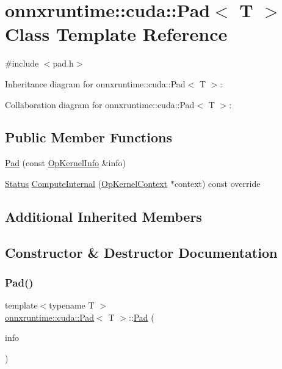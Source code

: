 \hypertarget{classonnxruntime_1_1cuda_1_1Pad}{}\section{onnxruntime\+:\+:cuda\+:\+:Pad$<$ T $>$ Class Template Reference}
\label{classonnxruntime_1_1cuda_1_1Pad}


{\ttfamily \#include $<$pad.\+h$>$}



Inheritance diagram for onnxruntime\+:\+:cuda\+:\+:Pad$<$ T $>$\+:


Collaboration diagram for onnxruntime\+:\+:cuda\+:\+:Pad$<$ T $>$\+:
\subsection*{Public Member Functions}
\begin{DoxyCompactItemize}
\item 
\mbox{\hyperlink{classonnxruntime_1_1cuda_1_1Pad_a2fb88605bf6e2a0d6c91c73fbd785045}{Pad}} (const \mbox{\hyperlink{classonnxruntime_1_1OpKernelInfo}{Op\+Kernel\+Info}} \&info)
\item 
\mbox{\hyperlink{classonnxruntime_1_1common_1_1Status}{Status}} \mbox{\hyperlink{classonnxruntime_1_1cuda_1_1Pad_a32053f849d81904ceecb64f8adc82db8}{Compute\+Internal}} (\mbox{\hyperlink{classonnxruntime_1_1OpKernelContext}{Op\+Kernel\+Context}} $\ast$context) const override
\end{DoxyCompactItemize}
\subsection*{Additional Inherited Members}


\subsection{Constructor \& Destructor Documentation}
\mbox{\label{classonnxruntime_1_1cuda_1_1Pad_a2fb88605bf6e2a0d6c91c73fbd785045}} 
\subsubsection{\texorpdfstring{Pad()}{Pad()}}
{\footnotesize\ttfamily template$<$typename T $>$ \\
\mbox{\hyperlink{classonnxruntime_1_1cuda_1_1Pad}{onnxruntime\+::cuda\+::\+Pad}}$<$ T $>$\+::\mbox{\hyperlink{classonnxruntime_1_1cuda_1_1Pad}{Pad}} (\begin{DoxyParamCaption}\item[{const \mbox{\hyperlink{classonnxruntime_1_1OpKernelInfo}{Op\+Kernel\+Info}} \&}]{info }\end{DoxyParamCaption})\hspace{0.3cm}{\ttfamily [inline]}}



